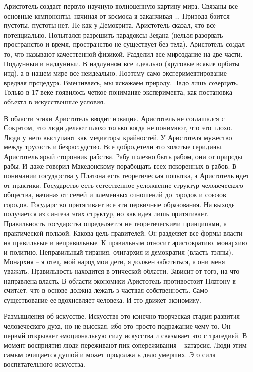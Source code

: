 \documentclass[a4paper, 12pt]{article}
\begin{document}
Аристотель создает первую научную полноценную картину мира. Связаны все основные компоненты, начиная от космоса и заканчивая ... Природа боится пустоты, пустоты нет. Не как у Демокрита. Аристотель сказал, что все потенциально. Попытался разрешить парадоксы Зедана (нельзя разорвать пространство и время, пространство не существует без тела). Аристотель создал то, что называют качественной физикой. Разделил все мироздание на две части. Подлунный и надлунный. В надлунном все идеально (круговые всякие орбиты итд), а в нашем мире все неидеально. Поэтому само экспериментирование вредная процедура. Вмешиваясь, мы искажаем природу. Надо лишь созерцать. Только в 17 веке появилось четкое понимание эксперимента, как постановка объекта в искусственные условия. 

В области этики Аристотель вводит новации. Аристотель не соглашался с Сократом, что люди делают плохо только когда не понимают, что это плохо. Люди у него выступают как медиаторы крайностей. У Аристотеля мужество между трусость и безрассудство. Все добродетели это золотые серидины. Аристотель ярый сторонник рабства. Рабу полезно быть рабом, они от природы рабы. И даже говорил Македонскому порабощать всех покоренных в рабов. В понимании государства у Платона есть теоретическая попытка, а Аристотель идет от практики. Государство есть естественное усложнение структур человеческого общества, начиная от семей и племенных отношений до городов и союзов городов. Государство притягивает все эти первичные образования. На выходе получается из синтеза этих структур, но как идея лишь притягивает. Правильность государства определяется не теоретическими принципами, а практической пользой. Какова цель правителей. Он разделяет все формы власти на правильные и неправильные. К правильным относит аристократию, монархию и политию. Неправильный тирания, олигархия и демократия (власть толпы). Монархия -- я отец, мой народ мои дети, я должен заботиться, а они меня уважать. Правильность находится в этической области. Зависит от того, на что направлена власть. В области экономики Аристотель противостоит Платону и считает, что в основе должна лежать в частная собственность. Само существование ее вдохновляет человека. И это движет экономику. 

Размышления об искусстве. Искусство это конечно творческая стадия развития человеческого духа, но не высокая, ибо это просто подражание чему-то. Он первый открывает эмоциональную силу искусства и связывает это с трагедией. В момент восприятия люди переживают пик сопереживания -- катарсис. Люди этим самым очищается душой и может продолжать дело умерших. Это сила воспитательного искусства. 
\end{document}
